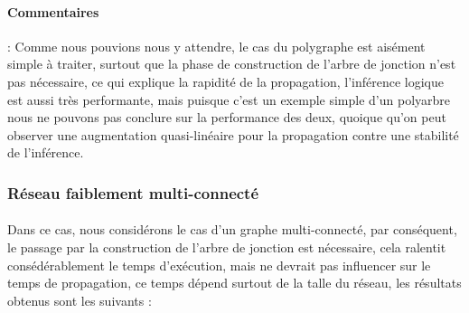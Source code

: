 \documentclass[]{report}
\begin{document}
    \paragraph{Commentaires}:
    Comme nous pouvions nous y attendre, le cas du polygraphe est aisément simple à traiter, surtout que la phase de construction de l'arbre de jonction n'est pas nécessaire, ce qui explique la rapidité de la propagation, l'inférence logique est aussi très performante, mais puisque c'est un exemple simple d'un polyarbre nous ne pouvons pas conclure sur la performance des deux, quoique qu'on peut observer une augmentation quasi-linéaire pour la propagation contre une stabilité de l'inférence.
	
	\subsubsection{Réseau faiblement multi-connecté}
	\paragraph{}
	Dans ce cas, nous considérons le cas d'un graphe multi-connecté, par conséquent, le passage par la construction de l'arbre de jonction
	est nécessaire, cela ralentit consédérablement le temps d'exécution, mais ne devrait pas influencer
	sur le temps de propagation, ce temps dépend surtout de la talle du réseau, les résultats obtenus sont les suivants :

	\begin{table}[H]
	\centering
	\end{table}
\end{document}

